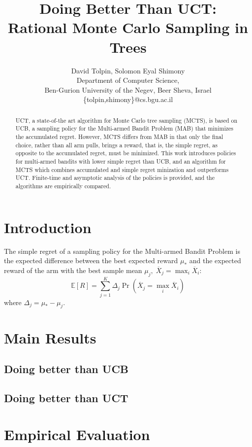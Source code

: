 \documentclass{article}
\title{Doing Better Than UCT: \\ Rational Monte Carlo Sampling in Trees}
\author {David Tolpin, Solomon Eyal Shimony \\
Department of Computer Science, \\
Ben-Gurion University of the Negev, Beer Sheva, Israel \\
\{tolpin,shimony\}@cs.bgu.ac.il}
\newcommand {\IE} {\ensuremath {\mathbb{E}}}
\begin{document}
\maketitle

\begin{abstract}
UCT, a state-of-the art algorithm for Monte Carlo tree sampling
(MCTS), is based on UCB, a sampling policy for the Multi-armed Bandit
Problem (MAB) that minimizes the accumulated regret. However, MCTS
differs from MAB in that only the final choice, rather than all arm
pulls, brings a reward, that is, the simple regret, as opposite to the
accumulated regret, must be minimized. This work introduces policies for
multi-armed bandits with lower simple regret than UCB, and an
algorithm for MCTS which combines accumulated and simple regret
minization and outperforms UCT. Finite-time and asymptotic analysis of
the policies is provided, and the algorithms are empirically compared.
\end{abstract}


\section{Introduction}

The simple regret of a sampling policy for the Multi-armed Bandit
Problem is the expected difference between the best expected reward
$\mu_*$ and the expected reward of the arm with the best sample mean
$\mu_j,\;\overline X_j=\max_i\overline X_i$:
\begin{equation}
\label{eq:simple-regret}
\IE[R]=\sum_{j=1}^K\Delta_j\Pr(\overline X_j=\max_i\overline X_i)
\end{equation}
where $\Delta_j=\mu_*-\mu_j$.

\section{Main Results}

\subsection{Doing better than UCB}

\subsection{Doing better than UCT}


\section{Empirical Evaluation}
\end{document}
